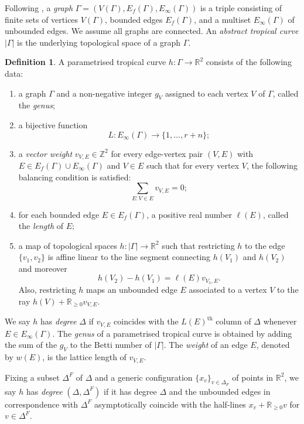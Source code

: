 \documentclass[11pt]{amsart}
\numberwithin{equation}{section}
\theoremstyle{plain}
\theoremstyle{remark}
\theoremstyle{definition}
\newtheorem{definition}[theorem]{Definition}
\newcommand{\RR}{\mathbb{R}}
\newcommand{\supth}[1]{\ensuremath{#1^{\mathrm{th}}}}
\begin{document}
    Following \cite{abramovich2016skeletons}, a \textit{graph} $\Gamma = (V(\Gamma),E_f(\Gamma),E_{\infty}(\Gamma))$ is a triple consisting of finite sets of vertices $V(\Gamma)$, bounded edges $E_f(\Gamma)$, and a multiset $E_{\infty}(\Gamma)$ of unbounded edges. We assume all graphs are connected. 
An \textit{abstract tropical curve} $|\Gamma|$ is the underlying topological space of a graph $\Gamma$.

{\samepage
  \begin{definition}
    A parametrised tropical curve ${h}\colon{\Gamma} \rightarrow \mathbb{R}^2$ consists of the following data:
    \begin{enumerate}
    \item a graph $\Gamma$ and a non-negative integer $g_V$ assigned to each vertex $V$ of $\Gamma$, called the \textit{genus};
    \item a bijective function
          $$L\colon E_\infty(\Gamma)\longrightarrow \{1,\ldots,r+n\};$$
        \item a \textit{vector weight} $v_{V,E} \in \mathbb{Z}^2$ for every edge-vertex pair $(V,E)$ with $E\in E_f(\Gamma)\cup E_\infty(\Gamma)$ and $V\in E$ such that for every vertex $V$, the
following balancing condition is satisfied:
$$\sum_{E: V \in E} v_{V,E}=0;$$
\item for each bounded edge $E \in E_f(\Gamma)$, a positive real number $\ell(E)$, called the \textit{length} of $E$;
\item a map of topological spaces $h\colon |\Gamma| \rightarrow \mathbb{R}^2$ such that restricting $h$ to the edge $\{v_1,v_2\}$ is affine linear to the line segment connecting $h(V_1)$ and $h(V_2)$ and moreover 
$$h(V_2) - h(V_1) = \ell(E)v_{V_1,E}.$$
Also, restricting $h$ maps an unbounded edge $E$ associated to a vertex $V$ to the ray $h(V) + \mathbb{R}_{\geq 0}v_{V,E}$.
    \end{enumerate} 
We say $h$ has \textit{degree} $\Delta$ if $v_{V,E}$ coincides with the $\supth{L(E)}$ column of $\Delta$ whenever $E \in E_\infty (\Gamma)$. The \textit{genus} of a parametrised tropical curve is obtained by adding the sum of the $g_V$ to the Betti number of $|\Gamma|$. The \textit{weight} of an edge $E$, denoted by $w(E)$, is the lattice length of $v_{V,E}$.

Fixing a subset $\Delta^F$ of $\Delta$ and a generic configuration $\{x_v\}_{v\in \Delta_F}$ of points in $\mathbb{R}^2$, we say $h$ has \textit{degree} $(\Delta,\Delta^F)$ if it has degree $\Delta$ and the unbounded edges in correspondence
with $\Delta^F$ asymptotically coincide with the half-lines $x_v + \RR_{\geq 0}v$ for $v \in \Delta^F$.
  \end{definition}
  }
\end{document}
